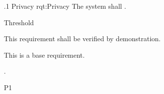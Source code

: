 \ONERQMTV
{\RqtNumberBase.1}
{Privacy}
{rqt:Privacy}
{The system shall \TBD.}
{
	\item [Phase 1] Threshold
}
{This requirement shall be verified by demonstration.}
{
\item [N/A] This is a base requirement.
}
{
	\item \TBD.
}
{P1}
